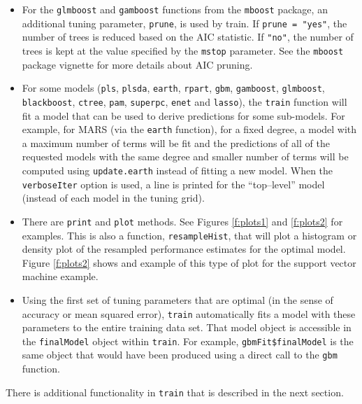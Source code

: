 \documentclass[12pt]{article}
\begin{document}
\begin{itemize}
   \item For the \texttt{glmboost} and \texttt{gamboost} functions from the \texttt{mboost} package, an additional tuning parameter, \texttt{prune}, is used by train. If \texttt{prune = "yes"}, the number of trees is reduced based on the AIC statistic. If \texttt{"no"}, the number of trees is kept at the value specified by the \texttt{mstop} parameter. See the \texttt{mboost} package vignette for more details about AIC pruning.	

   \item For some models (\texttt{pls}, \texttt{plsda}, \texttt{earth}, \texttt{rpart}, \texttt{gbm}, \texttt{gamboost}, \texttt{glmboost}, \texttt{blackboost}, \texttt{ctree}, \texttt{pam}, \texttt{superpc}, \texttt{enet} and \texttt{lasso}), the \texttt{train} function will fit a model that can be used to derive predictions for some sub-models. For example, for MARS (via the \texttt{earth} function), for a fixed degree, a model with a maximum number of terms will be fit and the predictions of all of the requested models with the same degree and smaller number of terms will be computed using \texttt{update.earth} instead of fitting a new model. When the \texttt{verboseIter} option is used, a line is printed for the ``top--level'' model (instead of each model in the tuning grid).

	\item There are \texttt{print} and \texttt{plot} methods. See Figures \ref{f:plots1} and \ref{f:plots2} for examples. This is also a function, \texttt{resampleHist}, that will plot a histogram or density plot of the resampled performance estimates for the optimal model. Figure \ref{f:plots2} shows and example of this type of plot for the support vector machine example.
	
	\item Using the first set of tuning parameters that are optimal (in the sense of accuracy or mean squared error), \texttt{train} automatically fits a model with these parameters to the entire training data set. That model object is accessible in the \texttt{finalModel} object within \texttt{train}. For example, \verb+gbmFit$finalModel+  is the same object that would have been produced using a direct call to the \texttt{gbm} function. 
	
\end{itemize}

There is additional functionality in \texttt{train} that is described in the next section.
\end{document}
